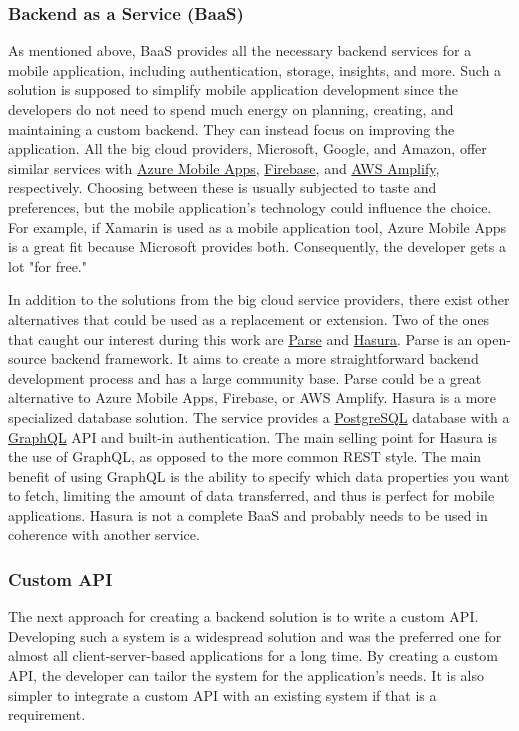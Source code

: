 \subsubsection{Backend as a Service (BaaS)}
As mentioned above, BaaS provides all the necessary backend services for a mobile application, including authentication, storage, insights, and more. Such a solution is supposed to simplify mobile application development since the developers do not need to spend much energy on planning, creating, and maintaining a custom backend. They can instead focus on improving the application. All the big cloud providers, Microsoft, Google, and Amazon, offer similar services with \href{https://azure.microsoft.com/en-us/solutions/mobile/}{Azure Mobile Apps}, \href{https://firebase.google.com}{Firebase}, and \href{https://aws.amazon.com/amplify/}{AWS Amplify}, respectively. Choosing between these is usually subjected to taste and preferences, but the mobile application’s technology could influence the choice. For example, if Xamarin is used as a mobile application tool, Azure Mobile Apps is a great fit because Microsoft provides both. Consequently, the developer gets a lot "for free."

In addition to the solutions from the big cloud service providers, there exist other alternatives that could be used as a replacement or extension. Two of the ones that caught our interest during this work are \href{https://parseplatform.org}{Parse} and \href{https://hasura.io}{Hasura}. Parse is an open-source backend framework. It aims to create a more straightforward backend development process and has a large community base. Parse could be a great alternative to Azure Mobile Apps, Firebase, or AWS Amplify. Hasura is a more specialized database solution. The service provides a \href{https://www.postgresql.org}{PostgreSQL} database with a \href{https://graphql.org}{GraphQL} API and built-in authentication. The main selling point for Hasura is the use of GraphQL, as opposed to the more common REST style. The main benefit of using GraphQL is the ability to specify which data properties you want to fetch, limiting the amount of data transferred, and thus is perfect for mobile applications. Hasura is not a complete BaaS and probably needs to be used in coherence with another service.

\subsubsection{Custom API}
The next approach for creating a backend solution is to write a custom API. Developing such a system is a widespread solution and was the preferred one for almost all client-server-based applications for a long time. By creating a custom API, the developer can tailor the system for the application’s needs. It is also simpler to integrate a custom API with an existing system if that is a requirement. 

